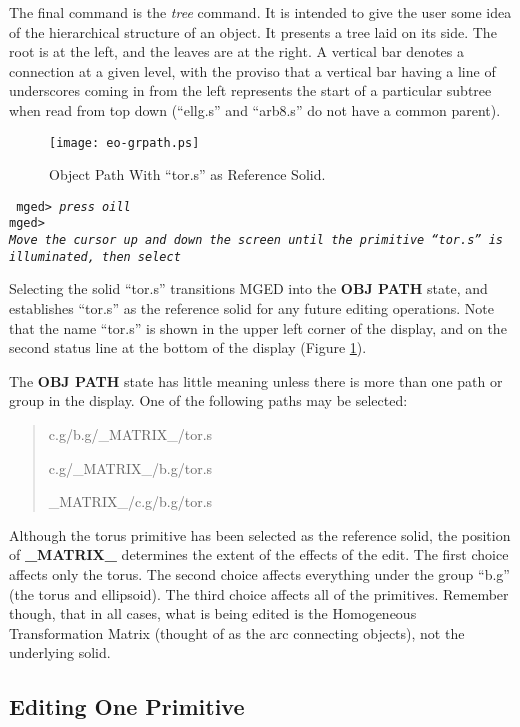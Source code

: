 The final command is the {\em tree} command.  It is intended to give the
user some idea of the hierarchical structure of an object.  It presents
a tree laid on its side.  The root is at the left, and the leaves are
at the right. A vertical bar denotes a connection at a given level, with
the proviso that a vertical bar having a line of underscores coming
in from the left represents the start of a particular subtree when read
from top down (``ellg.s'' and ``arb8.s'' do not have a common parent).

\begin{figure}
\centering \texttt{[image: eo-grpath.ps]}
\caption{Object Path With ``tor.s'' as Reference Solid.}
\label{eo-grpath}
\end{figure}

\noindent
{\tt
mged> {\em press oill}\\
mged>\\
{\em Move the cursor up and down the screen until the primitive ``tor.s''
is illuminated, then select}\\
}

Selecting the solid ``tor.s'' transitions MGED into the {\bf OBJ PATH}
state, and establishes ``tor.s'' as the reference solid for any future
editing operations.
Note that the name ``tor.s'' is shown in the upper left corner of the
display, and on the second status line at the bottom of the display
(Figure \ref{eo-grpath}).

The {\bf OBJ PATH} state has little meaning unless there is more than one path
or group in the display.  One of the following paths may be selected:

\begin{quote}
c.g/b.g/\_MATRIX\_/tor.s

c.g/\_MATRIX\_/b.g/tor.s

\_MATRIX\_/c.g/b.g/tor.s
\end{quote}

Although the torus primitive has been selected as the reference solid,
the position of {\bf \_MATRIX\_} determines the extent of the effects of
the edit.  The first choice affects only the torus.  The second choice
affects everything under the group ``b.g'' (the torus and ellipsoid).
The third choice affects all of the primitives.  Remember though, that
in all cases, what is being edited is the Homogeneous Transformation
Matrix (thought of as the arc connecting objects), not the underlying
solid.

\subsection{Editing One Primitive}

